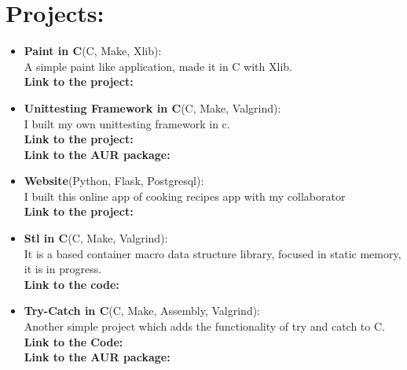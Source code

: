\documentclass{article}
\begin{document}
\space
\space
\space
\space
\space
\begin{minipage}[t]{8cm}
  \vspace*{-2cm}
  
\section*{Projects:}
\begin{itemize}
  \setlength\itemsep{0.01cm}

\item \textbf{Paint in C}(C, Make, Xlib):\\
  A simple paint like application, made it in C with Xlib.\\
  \textbf{Link to the project:} \href{https://github.com/alecksandr26/xlib-paint}{\color{Blue}{Github}}
\item \textbf{Unittesting Framework in C}(C, Make, Valgrind):\\
  I built my own unittesting framework in c.\\
  \textbf{Link to the project:} \href{https://github.com/alecksandr26/unittest-c}{\color{Blue}{Github}}\\
  \textbf{Link to the AUR package:}
  \href{https://aur.archlinux.org/packages/unittest-c}{\color{Blue}{AUR}}
\item \textbf{Website}(Python, Flask, Postgresql):\\
  I built this online app of cooking recipes app with my collaborator
  \href{https://github.com/Experthor}{\color{blue}{Experthor}}\\
  \textbf{Link to the project:} \href{https://github.com/alecksandr26/recipe-app-web}{\color{Blue}{Github}}
\item \textbf{Stl in C}(C, Make, Valgrind):\\
  It is a based container macro data structure library, focused in static memory, it is in progress.\\
  \textbf{Link to the code:} \href{https://github.com/alecksandr26/stl-c}{\color{Blue}{GitHub}}
\item \textbf{Try-Catch in C}(C, Make, Assembly, Valgrind): \\
  Another simple project which adds the functionality of try and catch to C.\\
  \textbf{Link to the Code:} \href{https://github.com/alecksandr26/trycatch-c}{\color{Blue}{GitHub}}\\
  \textbf{Link to the AUR package:} \href{https://aur.archlinux.org/packages/trycatch-c}{\color{Blue}{AUR}}

\end{itemize}
\end{minipage}
\end{document}
